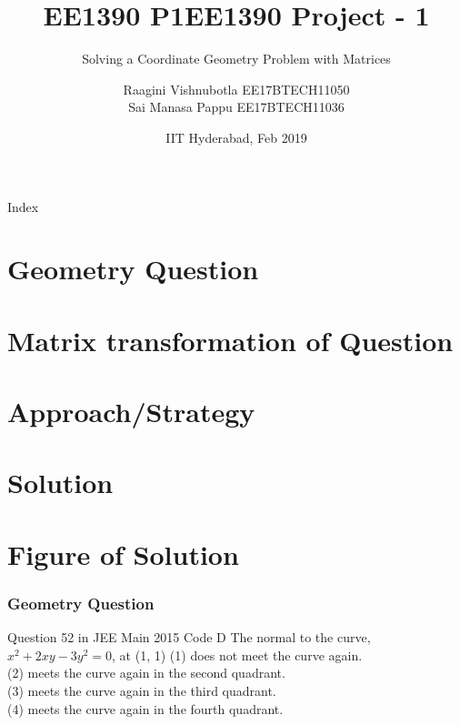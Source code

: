 \documentclass{beamer}
\title[Project]{EE1390 P1}
\title{EE1390 Project - 1}
\subtitle{Solving a Coordinate  Geometry Problem with Matrices}
\author{Raagini Vishnubotla EE17BTECH11050 \\
   Sai Manasa Pappu EE17BTECH11036}
\date{IIT Hyderabad, Feb 2019}
\begin{document}
\begin{frame}
\titlepage 
\end{frame}


\begin{frame}{Index}
  \tableofcontents
\end{frame}

\section{Geometry Question}
\section{Matrix transformation of Question}
\section{Approach/Strategy}
\section{Solution}
\section{Figure of Solution}


\begin{frame}
\frametitle{Geometry Question}
\begin{block}{Question 52 in JEE Main 2015 Code D}
\bigbreak
The normal to the curve, $x^2 + 2xy - 3y^2 = 0$, at (1, 1) 
\bigbreak
(1) does not meet the curve again.\\
(2) meets the curve again in the second quadrant.\\
(3) meets the curve again in the third quadrant.\\
(4) meets the curve again in the fourth quadrant.
\bigbreak
\end{block}
\end{frame}
\end{document}
